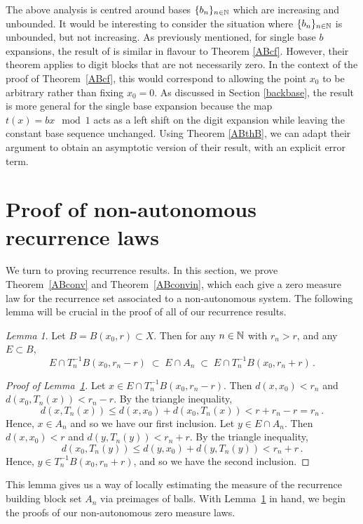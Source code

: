 \documentclass[11pt,reqno]{amsart}
\newcommand{\N}{{\Bbb N}}
\newcommand{\0}{\mathbf{0}}
\newtheorem{lemma}{Lemma}
\theoremstyle{remark}
\numberwithin{equation}{section}
\newtheorem{lemma}[theorem]{Lemma}
\theoremstyle{remark}
\numberwithin{equation}{section}
\begin{document}
The above analysis is centred around bases $\{b_n\}_{n \in \N}$ which are increasing and unbounded. It would be interesting to consider the situation where $\{b_n\}_{n \in \N}$ is unbounded, but not increasing.
As previously mentioned, for single base $b$ expansions, the result of \cite[Theorem 5]{FMP} is similar in flavour to Theorem \ref{ABcf}. However, their theorem applies to digit blocks that are not necessarily zero. In the context of the proof of Theorem~\ref{ABcf}, this would correspond to allowing the point $x_0$ to be arbitrary rather than fixing $x_0=0$. As discussed in Section \ref{backbase}, the result is more general for the single base expansion because the map $t(x)=bx\mod 1$ acts as a left shift on the digit expansion while leaving the constant base sequence unchanged. Using Theorem \ref{ABthB}, we can adapt their argument to obtain an asymptotic version of their result, with an explicit error term.
\medskip

\section{Proof of non-autonomous recurrence laws} \label{nonrecres}
We turn to proving recurrence results. In this section, we prove Theorem~\ref{ABconv} and Theorem~\ref{ABconvin}, which each give a zero measure law for the recurrence set associated to a non-autonomous system. The following lemma will be crucial in the proof of all of our recurrence results. 
    \begin{lemma}\label{trig}
    Let $B=B(x_0,r) \subset X$. Then for any $n \in \N$ with $r_n >r$, and any $E \subset B$, 
    $$
    E \cap T_n^{-1}B(x_0, r_n -r) \; \subset \; E \cap A_n \; \subset \;  E \cap T_n^{-1}B(x_0, r_n +r) \, .
    $$
\end{lemma}
\begin{proof}[Proof of Lemma~\ref{trig}]
Let $x \in E \cap T^{-1}_nB(x_0,r_n-r)$. Then 
$d(x,x_0)< r_n$ and $d(x_0, T_n(x))< r_n-r$.
By the triangle inequality,
$$
d(x,T_n(x)) \leq d(x,x_0) + d(x_0,T_n(x)) < r + r_n - r = r_n \, .
$$
Hence,  $x \in A_n$ and so we have our first inclusion. Let $y \in E \cap A_n$. Then $d(x,x_0)<r$ and $d(y,T_n(y))<r_n+r$. By the triangle inequality, 
$$
d(x_0,T_n(y)) \leq d(y,x_0) + d(y,T_n(y))<r_n + r \, .
$$
Hence, $y \in T_n^{-1}B(x_0,r_n+r)$, and so we have the second inclusion.
\end{proof}
This lemma gives us a way of locally estimating the measure of the recurrence building block set $A_n$ via preimages of balls. With Lemma~\ref{trig} in hand, we begin the proofs of our non-autonomous zero measure laws.
\end{document}
